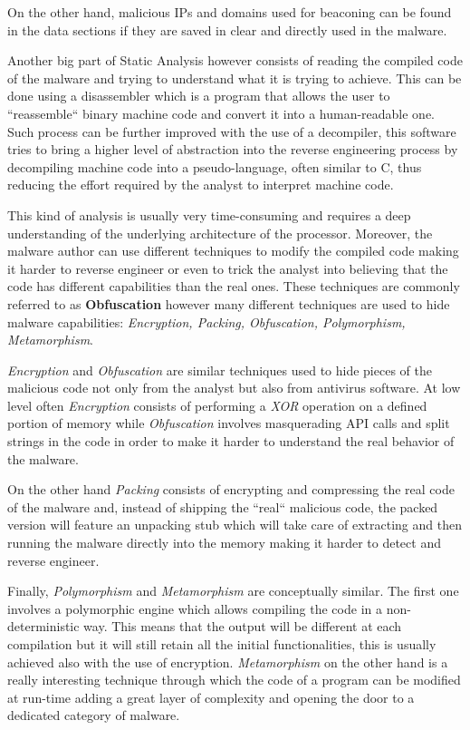  On the other hand, malicious IPs and domains used for beaconing can be found in the data sections if they are saved in clear and directly used in the malware.  

Another big part of Static Analysis however consists of reading the compiled code of the malware and trying to understand what it is trying to achieve. This can be done using a disassembler which is a program that allows the user to ``reassemble`` binary machine code and convert it into a human-readable one. Such process can be further improved with the use of a decompiler, this software tries to bring a higher level of abstraction into the reverse engineering process by decompiling machine code into a pseudo-language, often similar to C, thus reducing the effort required by the analyst to interpret machine code.

This kind of analysis is usually very time-consuming and requires a deep understanding of the underlying architecture of the processor. Moreover, the malware author can use different techniques to modify the compiled code making it harder to reverse engineer or even to trick the analyst into believing that the code has different capabilities than the real ones. These techniques are commonly referred to as \textbf{Obfuscation} however many different techniques are used to hide malware capabilities: \textit{Encryption, Packing, Obfuscation, Polymorphism, Metamorphism}.~\cite{Ye2017ASO}

\textit{Encryption} and \textit{Obfuscation} are similar techniques used to hide pieces of the malicious code not only from the analyst but also from antivirus software. At low level often \textit{Encryption} consists of performing a \textit{XOR} operation on a defined portion of memory while \textit{Obfuscation} involves masquerading API calls and split strings in the code in order to make it harder to understand the real behavior of the malware.

On the other hand \textit{Packing} consists of encrypting and compressing the real code of the malware and, instead of shipping the ``real`` malicious code, the packed version will feature an unpacking stub which will take care of extracting and then running the malware directly into the memory making it harder to detect and reverse engineer.

Finally, \textit{Polymorphism} and \textit{Metamorphism} are conceptually similar. The first one involves a polymorphic engine which allows compiling the code in a non-deterministic way. This means that the output will be different at each compilation but it will still retain all the initial functionalities, this is usually achieved also with the use of encryption. \textit{Metamorphism} on the other hand is a really interesting technique through which the code of a program can be modified at run-time adding a great layer of complexity and opening the door to a dedicated category of malware.

